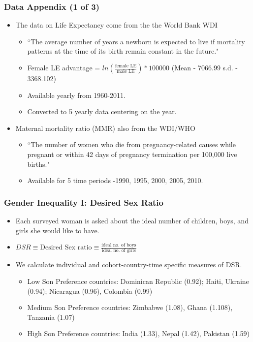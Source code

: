 \documentclass[legno]{beamer}
\begin{document}
\begin{frame}[label=dataapp]
\frametitle{Data Appendix (1 of 3)}
\begin{itemize}
	\item The data on Life Expectancy come from the the World Bank WDI
	\begin{itemize}
		\item ``The average number of years a newborn is expected to live if mortality patterns at the time of its birth remain constant in the future." 
		\item Female LE advantage = $ln(\frac{\text{female LE}}{\text{male LE}})*100000$ (Mean - 7066.99   s.d. - 3368.102)
		\item Available yearly from 1960-2011.
		\item Converted to 5 yearly data centering on the year.
	\end{itemize}
	\item Maternal mortality ratio (MMR) also from the WDI/WHO  	
	\begin{itemize}
		\item ``The number of women who die from pregnancy-related causes while pregnant or within 42 days of pregnancy termination per 100,000 live births."
		\item Available for 5 time periods -1990, 1995, 2000, 2005, 2010.
	\end{itemize}
\end{itemize}
\end{frame}


\begin{frame}
\frametitle{Gender Inequality I: Desired Sex Ratio}
\begin{itemize}
\setlength{\itemsep}{20pt}
	\item Each surveyed woman is asked about the ideal number of children, boys, and girls she would like to have. 
	\item	$DSR \equiv \text{Desired Sex ratio} \equiv \frac{\text{ideal no. of boys}}{\text{ideal no. of girls}}$
	\item We calculate individual and cohort-country-time specific measures of DSR. 
\begin{itemize}
		\item Low Son Preference countries: Dominican Republic (0.92); Haiti, Ukraine (0.94); Nicaragua (0.96), Colombia (0.99) 
		\item Medium Son Preference countries: Zimbabwe (1.08), Ghana (1.108), Tanzania (1.07) 
		\item High Son Preference countries: India (1.33), Nepal (1.42), Pakistan (1.59)
\end{itemize}
\end{itemize}
\end{frame}
\end{document}
